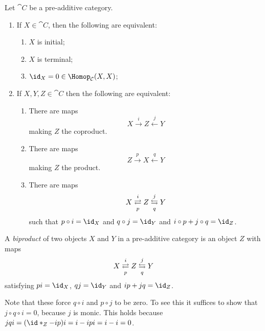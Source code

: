 \documentclass[../main.tex]{subfiles}
\begin{document}
\begin{lem}\label{lem:pre-additive-categories-are-nice}
Let $\cat C$ be a pre-additive category.
\begin{enumerate}
  \item If $X \in \cat C$, then the following are equivalent:
  \begin{enumerate}
    \item\label{lem:pre-additive-categories-are-nice:initial} $X$ is initial;
    \item\label{lem:pre-additive-categories-are-nice:terminal} $X$ is terminal;
    \item\label{lem:pre-additive-categories-are-nice:identity-zero} $\id_X = 0 \in \Hom_{\cat C}(X,X)$;
  \end{enumerate}
  \item If $X, Y, Z \in \cat C$ then the following are equivalent:
  \begin{enumerate}
    \item\label{lem:pre-additive-categories-are-nice:coproduct} There are maps \[X \xrightarrow{i} Z \xleftarrow{j} Y\] making $Z$ the coproduct.
    \item\label{lem:pre-additive-categories-are-nice:product} There are maps \[Z \xrightarrow{p} X \xleftarrow{q} Y\] making $Z$ the product.
    \item\label{lem:pre-additive-categories-are-nice:biproduct} There are maps \[X \xrightleftarrows{i}[p] Z \xleftrightarrows{j}[q] Y\] such that $p \circ i = \id_X$ and $q \circ j = \id_Y$ and $i\circ p + j \circ q = \id_Z$.
  \end{enumerate}
\end{enumerate}
\end{lem}

\begin{defn}
A \emph{biproduct} of two objects \(X\) and \(Y\) in a pre-additive category is an object $Z$ with maps \[X \xrightleftarrows{i}[p] Z \xleftrightarrows{j}[q] Y\] satisfying $pi = \id_X$, $qj = \id_Y$ and $ip + jq = \id_Z$.
\end{defn}
\begin{rmk}
  Note that these force $q \circ i$ and $p \circ j$ to be zero. To see this it suffices to show that $j \circ q \circ i = 0$, because $j$ is monic.
  This holds because $jqi = (\id*_Z - ip)i = i - ipi = i - i = 0$.
\end{rmk}
\end{document}
